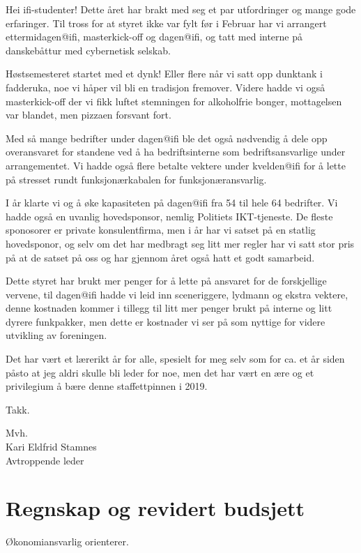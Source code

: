 \documentclass[10pt,norsk,a4paper]{article}
\begin{document}
\begin{multicols}{2}

Hei ifi-studenter!
Dette året har brakt med seg et par utfordringer og mange gode erfaringer.
Til tross for at styret ikke var fylt før i Februar har vi arrangert ettermidagen@ifi, masterkick-off og dagen@ifi, og tatt med interne på danskebåttur med cybernetisk selskab. 

Høstsemesteret startet med et dynk! Eller flere når vi satt opp dunktank i fadderuka, noe vi håper vil bli en tradisjon fremover. Videre hadde vi også masterkick-off der vi fikk luftet stemningen for alkoholfrie bonger, mottagelsen var blandet, men pizzaen forsvant fort.

Med så mange bedrifter under dagen@ifi ble det også nødvendig å dele opp overansvaret for standene ved å ha bedriftsinterne som bedriftsansvarlige under arrangementet. Vi hadde også flere betalte vektere under kvelden@ifi for å lette på stresset rundt funksjonærkabalen for funksjonæransvarlig.

I år klarte vi og å øke kapasiteten på dagen@ifi fra 54 til hele 64 bedrifter.
Vi hadde også en uvanlig hovedsponsor, nemlig Politiets IKT-tjeneste. De fleste sponosorer er private konsulentfirma, men i år har vi satset på en statlig hovedsponor, og selv om det har medbragt seg litt mer regler har vi satt stor pris på at de satset på oss og har gjennom året også hatt et godt samarbeid.

Dette styret har brukt mer penger for å lette på ansvaret for de forskjellige vervene, til dagen@ifi hadde vi leid inn sceneriggere, lydmann og ekstra vektere, denne kostnaden kommer i tillegg til litt mer penger brukt på interne og litt dyrere funkpakker, men dette er kostnader vi ser på som nyttige for videre utvikling av foreningen.

Det har vært et lærerikt år for alle, spesielt for meg selv som for ca. et år siden påsto at jeg aldri skulle bli leder for noe, men det har vært en ære og et privilegium å bære denne staffettpinnen i 2019.


\end{multicols}

Takk.

Mvh. \\
Kari Eldfrid Stamnes \\
Avtroppende leder \\

\section{Regnskap og revidert budsjett}
Økonomiansvarlig orienterer.
\end{document}
